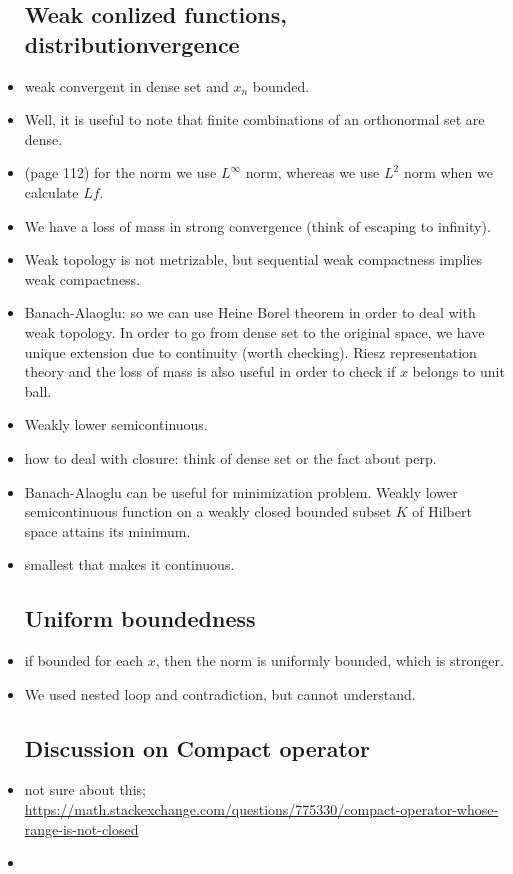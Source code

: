 \documentclass{article}
\theoremstyle{remark}
\begin{document}
\begin{itemize}
\subsection*{Weak conlized functions, distributionvergence}
\item weak convergent in dense set and $x_n$ bounded.
\item Well, it is useful to note that finite combinations of an orthonormal set are dense.
\item (page 112) for the norm we use $L^\infty$ norm, whereas we use $L^2$ norm when we calculate $Lf$.
\item We have a loss of mass in strong convergence (think of escaping to infinity).
\item Weak topology is not metrizable, but sequential weak compactness implies weak compactness.
\item Banach-Alaoglu: so we can use Heine Borel theorem in order to deal with weak topology. In order to go from dense set to the original space, we have unique extension due to continuity (worth checking). Riesz representation theory and the loss of mass is also useful in order to check if $x$ belongs to unit ball.
\item Weakly lower semicontinuous.
\item how to deal with closure: think of dense set or the fact about perp. 
\item Banach-Alaoglu can be useful for minimization problem. Weakly lower semicontinuous function on a weakly closed bounded subset $K$ of Hilbert space attains its minimum.
\item smallest that makes it continuous.




\subsection*{Uniform boundedness}
\item if bounded for each $x$, then the norm is uniformly bounded, which is stronger.

\item We used nested loop and contradiction, but cannot understand.






\subsection*{Discussion on Compact operator}
\item not sure about this; \url{https://math.stackexchange.com/questions/775330/compact-operator-whose-range-is-not-closed}
\item 



\end{itemize}
\end{document}

